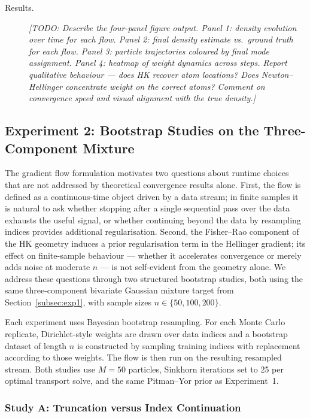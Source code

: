 \begin{description}
  \item[Results.]
  \textit{[TODO: Describe the four-panel figure output.
  Panel 1: density evolution over time for each flow.
  Panel 2: final density estimate vs.\ ground truth for each flow.
  Panel 3: particle trajectories coloured by final mode assignment.
  Panel 4: heatmap of weight dynamics across steps.
  Report qualitative behaviour --- does HK recover atom locations?
  Does Newton--Hellinger concentrate weight on the correct atoms?
  Comment on convergence speed and visual alignment with the true density.]}
\end{description}

\subsection{Experiment 2: Bootstrap Studies on the Three-Component Mixture}
\label{subsec:exp2}

The gradient flow formulation motivates two questions about runtime choices that are not
addressed by theoretical convergence results alone.
First, the flow is defined as a continuous-time object driven by a data stream; in finite
samples it is natural to ask whether stopping after a single sequential pass over the data
exhausts the useful signal, or whether continuing beyond the data by resampling indices
provides additional regularisation.
Second, the Fisher--Rao component of the HK geometry induces a prior regularisation term in
the Hellinger gradient; its effect on finite-sample behaviour --- whether it accelerates
convergence or merely adds noise at moderate $n$ --- is not self-evident from the geometry
alone.
We address these questions through two structured bootstrap studies, both using the same
three-component bivariate Gaussian mixture target from Section~\ref{subsec:exp1}, with sample
sizes $n \in \{50, 100, 200\}$.

Each experiment uses Bayesian bootstrap resampling.
For each Monte Carlo replicate, Dirichlet-style weights are drawn over data indices and a
bootstrap dataset of length $n$ is constructed by sampling training indices with replacement
according to those weights.
The flow is then run on the resulting resampled stream.
Both studies use $M = 50$ particles, Sinkhorn iterations set to 25 per optimal transport
solve, and the same Pitman--Yor prior as Experiment~1.

\subsubsection{Study A: Truncation versus Index Continuation}
\label{subsubsec:studyA}

